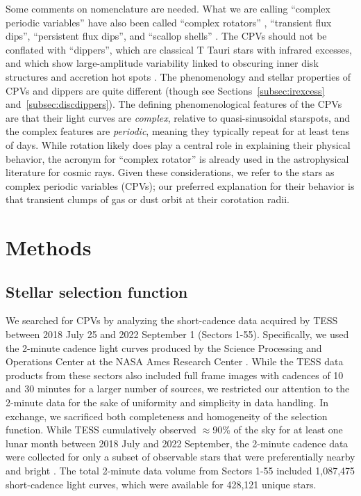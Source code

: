 \documentclass[11pt,twocolumn,tighten,linenumbers]{aastex63}
\begin{document}
Some comments on nomenclature are needed.  What we are calling
``complex periodic variables'' \citep{2023MNRAS.518.2921K} have also
been called ``complex rotators''
\citep{2019ApJ...876..127Z,2022AJ....163..144G,2023ApJ...945..114P},
``transient flux dips'', ``persistent flux dips'', and ``scallop
shells'' \citep{2017AJ....153..152S}.  The CPVs should not be
conflated with ``dippers'', which are classical T Tauri stars with
infrared excesses, and which show large-amplitude variability linked
to obscuring inner disk structures and accretion hot spots
\citep{2014AJ....147...82C,2021ApJ...908...16R}.  The phenomenology
and stellar properties of CPVs and dippers are quite different (though
see Sections~\ref{subsec:irexcess} and~\ref{subsec:discdippers}).  The
defining phenomenological features of the CPVs are that their light
curves are {\it complex}, relative to quasi-sinusoidal starspots, and
the complex features are {\it periodic}, meaning they typically repeat
for at least tens of days.  While rotation likely does play a central
role in explaining their physical behavior, the acronym for ``complex
rotator'' is already used in the astrophysical literature for cosmic
rays.  Given these considerations, we refer to the stars as complex
periodic variables (CPVs); our preferred explanation for their
behavior is that transient clumps of gas or dust orbit at their
corotation radii.


\section{Methods}
\label{sec:methods}

\subsection{Stellar selection function}
\label{subsec:selectionfn}

We searched for CPVs by analyzing the short-cadence data acquired by
TESS between 2018 July 25 and 2022 September 1 (Sectors 1-55).
Specifically, we used the 2-minute cadence light curves produced by
the Science Processing and Operations Center at the NASA Ames Research
Center \citep{2016SPIE.9913E..3EJ}.  While the TESS data products from
these sectors also included full frame images with cadences of 10 and
30 minutes for a larger number of sources, we restricted our attention
to the 2-minute data for the sake of uniformity and simplicity in data
handling.  In exchange, we sacrificed both completeness and
homogeneity of the selection function.  While TESS cumulatively
observed $\approx$90\% of the sky for at least one lunar month between
2018 July and 2022 September, the 2-minute cadence data were collected
for only a subset of observable stars that were preferentially nearby
and bright \citep[see][]{2021PASP..133i5002F}.  The total 2-minute
data volume from Sectors 1-55 included 1{,}087{,}475 short-cadence
light curves, which were available for 428{,}121 unique stars.
\end{document}
